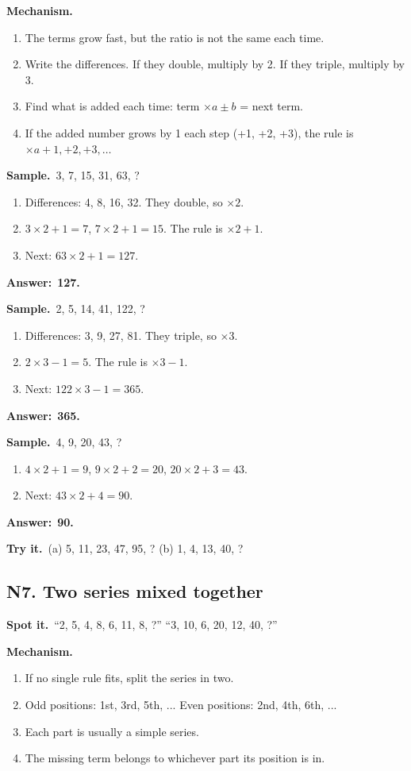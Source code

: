 \documentclass[11pt,a4paper]{article}
\let\oldsubsection\subsection
\renewcommand{\subsection}{\needspace{9\baselineskip}\oldsubsection}
\newcommand{\spot}{\textbf{\color{ember}Spot it.}\ }
\newcommand{\mech}{\textbf{\color{ember}Mechanism.}\ }
\newif\ifkeepsamp
\newcommand{\ans}[1]{\par\nopagebreak\noindent\textbf{\color{ember}Answer:}\ \textbf{#1}\par}
\newcommand{\samp}{\ifkeepsamp\needspace{4\baselineskip}\fi\textbf{\color{ember}Sample.}\ }
\newcommand{\tryit}[1]{\textbf{\color{ember}Try it.}\ #1}
\begin{document}
\mech
\begin{enumerate}
\item The terms grow fast, but the ratio is not the same each time.
\item Write the differences. If they double, multiply by 2. If they triple, multiply by 3.
\item Find what is added each time: term $\times a \pm b$ = next term.
\item If the added number grows by 1 each step (+1, +2, +3), the rule is $\times a + 1, +2, +3, \dots$
\end{enumerate}

\samp 3, 7, 15, 31, 63, ?
\begin{enumerate}
\item Differences: 4, 8, 16, 32. They double, so $\times 2$.
\item $3 \times 2 + 1 = 7$, $7 \times 2 + 1 = 15$. The rule is $\times 2 + 1$.
\item Next: $63 \times 2 + 1 = 127$.
\end{enumerate}
\ans{127.}

\samp 2, 5, 14, 41, 122, ?
\begin{enumerate}
\item Differences: 3, 9, 27, 81. They triple, so $\times 3$.
\item $2 \times 3 - 1 = 5$. The rule is $\times 3 - 1$.
\item Next: $122 \times 3 - 1 = 365$.
\end{enumerate}
\ans{365.}

\samp 4, 9, 20, 43, ?
\begin{enumerate}
\item $4 \times 2 + 1 = 9$, $9 \times 2 + 2 = 20$, $20 \times 2 + 3 = 43$.
\item Next: $43 \times 2 + 4 = 90$.
\end{enumerate}
\ans{90.}

\tryit (a) 5, 11, 23, 47, 95, ? (b) 1, 4, 13, 40, ?

\subsection{N7. Two series mixed together}
\spot ``2, 5, 4, 8, 6, 11, 8, ?'' ``3, 10, 6, 20, 12, 40, ?''

\mech
\begin{enumerate}
\item If no single rule fits, split the series in two.
\item Odd positions: 1st, 3rd, 5th, ... Even positions: 2nd, 4th, 6th, ...
\item Each part is usually a simple series.
\item The missing term belongs to whichever part its position is in.
\end{enumerate}
\end{document}
